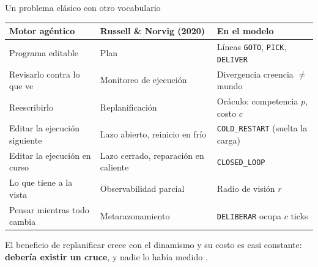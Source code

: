 \documentclass[aspectratio=169]{beamer}
\newcommand{\pol}[1]{\texttt{#1}}
\newcommand{\CR}{\pol{COLD\_RESTART}}
\newcommand{\CL}{\pol{CLOSED\_LOOP}}
\begin{document}
\begin{frame}{Un problema clásico con otro vocabulario}
  \centering\footnotesize
  \renewcommand{\arraystretch}{1.18}
  \setlength{\tabcolsep}{4pt}
  \begin{tabular}{@{}l l l@{}}
    \toprule
    \textbf{Motor agéntico} & \textbf{Russell \& Norvig (2020)} & \textbf{En el modelo} \\
    \midrule
    Programa editable           & Plan                                 & Líneas \texttt{GOTO}, \texttt{PICK}, \texttt{DELIVER} \\
    Revisarlo contra lo que ve  & Monitoreo de ejecución               & Divergencia creencia $\neq$ mundo \\
    Reescribirlo                & Replanificación                      & Oráculo: competencia $p$, costo $c$ \\
    Editar la ejecución siguiente & Lazo abierto, reinicio en frío     & \CR{} (suelta la carga) \\
    Editar la ejecución en curso  & Lazo cerrado, reparación en caliente & \CL{} \\
    Lo que tiene a la vista     & Observabilidad parcial               & Radio de visión $r$ \\
    Pensar mientras todo cambia & Metarazonamiento                     & \texttt{DELIBERAR} ocupa $c$ ticks \\
    \bottomrule
  \end{tabular}

  \vspace{0.9em}
  \begin{minipage}{0.86\linewidth}\centering\small
    El beneficio de replanificar crece con el dinamismo y su costo es casi
    constante: \textbf{debería existir un cruce}, y nadie lo había medido
    \parencite{zilberstein2011metareasoning,fox2006plan}.
  \end{minipage}
\end{frame}
\end{document}
